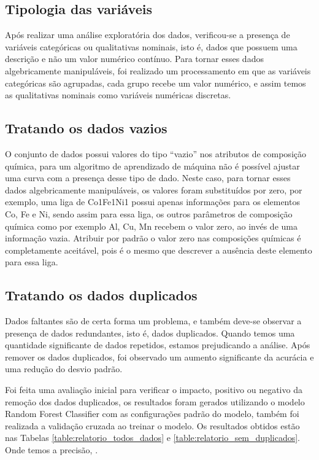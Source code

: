 \subsection{Tipologia das variáveis}\label{sec:MAT_MET_SEC_B_SUB_A}

Após realizar uma análise exploratória dos dados, verificou-se a presença de variáveis categóricas ou qualitativas nominais, isto é, dados que possuem uma descrição e não um valor numérico contínuo\cite{pinheiro2013probabilidade}. Para tornar esses dados algebricamente manipuláveis, foi realizado um processamento em que as variáveis categóricas são agrupadas, cada grupo recebe um valor numérico, e assim temos as qualitativas nominais como variáveis numéricas discretas\cite{pinheiro2013probabilidade}. 

\subsection{Tratando os dados vazios}\label{sec:MAT_MET_SEC_B_SUB_B}

O conjunto de dados possui valores do tipo ``vazio'' nos atributos de composição química, para um algoritmo de aprendizado de máquina não é possível ajustar uma curva com a presença desse tipo de dado. Neste caso, para tornar esses dados algebricamente manipuláveis, os valores foram substituídos por zero, por exemplo, uma liga de Co1Fe1Ni1 possui apenas informações para os elementos Co, Fe e Ni, sendo assim para essa liga, os outros parâmetros de composição química como por exemplo Al, Cu, Mn recebem o valor zero, ao invés de uma informação vazia. Atribuir por padrão o valor zero nas composições químicas é completamente aceitável, pois é o mesmo que descrever a ausência deste elemento para essa liga.

\subsection{Tratando os dados duplicados}\label{sec:MAT_MET_SEC_B_SUB_C}
Dados faltantes são de certa forma um problema, e também deve-se observar a presença de dados redundantes, isto é, dados duplicados. Quando temos uma quantidade significante de dados repetidos, estamos prejudicando a análise. Após remover os dados duplicados, foi observado um aumento significante da acurácia e uma redução do desvio padrão.

Foi feita uma avaliação inicial para verificar o impacto, positivo ou negativo da remoção dos dados duplicados, os resultados foram gerados utilizando o modelo Random Forest Classifier com as configurações padrão do modelo, também foi realizada a validação cruzada ao treinar o modelo. Os resultados obtidos estão nas Tabelas \ref{table:relatorio_todos_dados} e \ref{table:relatorio_sem_duplicados}. Onde temos a precisão, .

